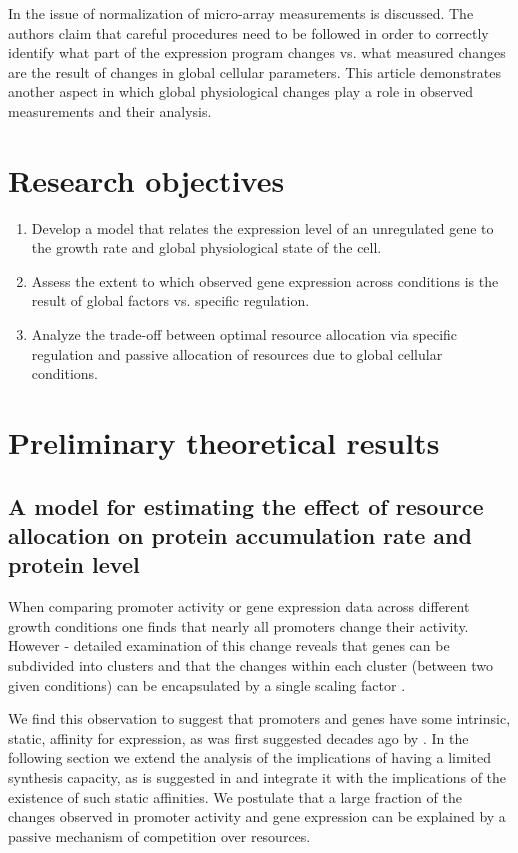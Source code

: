 \documentclass[a4page,notitlepage]{article}
\begin{document}
In \cite{loven2012} the issue of normalization of micro-array measurements is discussed.
The authors claim that careful procedures need to be followed in order to correctly identify what part of the expression program changes vs. what measured changes are the result of changes in global cellular parameters.
This article demonstrates another aspect in which global physiological changes play a role in observed measurements and their analysis.

\section{Research objectives}
\begin{enumerate}
\item Develop a model that relates the expression level of an unregulated gene to the growth rate and global physiological state of the cell.
\item Assess the extent to which observed gene expression across conditions is the result of global factors vs. specific regulation.
\item Analyze the trade-off between optimal resource allocation via specific regulation and passive allocation of resources due to global cellular conditions.
\end{enumerate}
\section{Preliminary theoretical results}
\subsection{A model for estimating the effect of resource allocation on protein accumulation rate and protein level}
When comparing promoter activity or gene expression data across different growth conditions one finds that nearly all promoters change their activity.
However - detailed examination of this change reveals that genes can be subdivided into clusters and that the changes within each cluster (between two given conditions) can be encapsulated by a single scaling factor \cite{Leeat2013}.

We find this observation to suggest that promoters and genes have some intrinsic, static, affinity for expression, as was first suggested decades ago by \cite{Maaloe1969}.
In the following section we extend the analysis of the implications of having a limited synthesis capacity, as is suggested in \cite{Leeat2013} and integrate it with the implications of the existence of such static affinities.
We postulate that a large fraction of the changes observed in promoter activity and gene expression can be explained by a passive mechanism of competition over resources.
\end{document}
